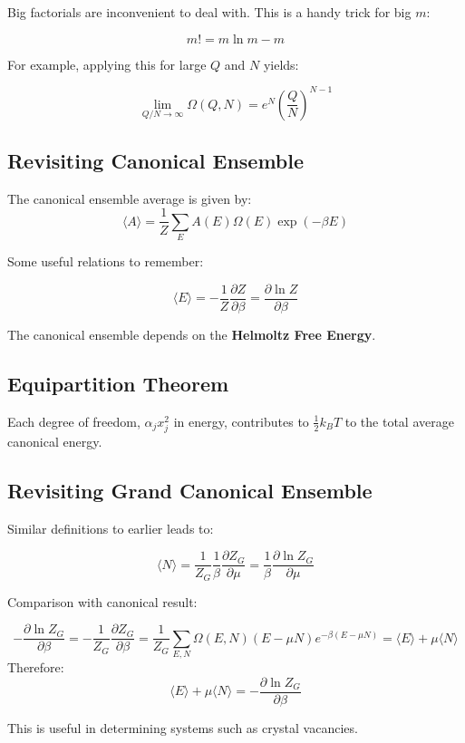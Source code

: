 \documentclass[12pt]{article}
\begin{document}
Big factorials are inconvenient to deal with. This is a handy trick for big $m$:

\[ \boxed{ m! = m\ln{m} - m}\]

For example, applying this for large $Q$ and $N$ yields:

\[\lim_{Q/N\to\infty}\Omega(Q,N) = e^N \left(\frac{Q}{N}\right)^{N-1}\]

\subsection{Revisiting Canonical Ensemble}

The canonical ensemble average is given by:
\[\langle A \rangle = \frac{1}{Z}\sum_E A(E)\Omega(E)\exp{(-\beta E)}\]

Some useful relations to remember:

\[\boxed{\langle E \rangle = -\frac{1}{Z}\frac{\partial Z}{\partial \beta} = \frac{\partial \ln Z}{\partial \beta}}\]

The canonical ensemble depends on the \textbf{Helmoltz Free Energy}.

\subsection{Equipartition Theorem}

Each degree of freedom, $\alpha_j x_j^2$ in energy, contributes to $\frac12 k_B T$ to the total average canonical energy.


\subsection{Revisiting Grand Canonical Ensemble}

Similar definitions to earlier leads to:

\[\boxed{\langle N \rangle = \frac{1}{Z_G}\frac{1}{\beta}\frac{\partial Z_G}{\partial \mu} = \frac{1}{\beta}\frac{\partial \ln Z_G}{\partial \mu}}\]

Comparison with canonical result:

\[-\frac{\partial \ln Z_G}{\partial \beta} = -\frac{1}{Z_G}\frac{\partial Z_G}{\partial \beta} = \frac{1}{Z_G}\sum_{E,N}\Omega(E,N)(E-\mu N)e^{-\beta(E-\mu N)} = \langle E \rangle + \mu \langle N \rangle\]
Therefore:
\[\boxed{\langle E \rangle + \mu \langle N \rangle = -\frac{\partial \ln Z_G}{\partial \beta}}\]

This is useful in determining systems such as crystal vacancies.
\end{document}

